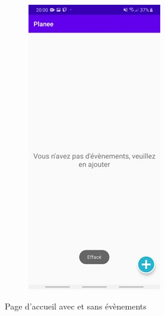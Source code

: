 \documentclass[12pt,a4paper]{report}
\begin{document}
\begin{flushleft}
\begin{figure}[!h]
\begin{subfigure}[b]{0.3\textwidth}
        \includegraphics[width=\textwidth]{HomeNoEvent}
    \end{subfigure}
    \caption{Page d'accueil avec et sans évènements}
\end{figure}
\end{flushleft}
\end{document}
